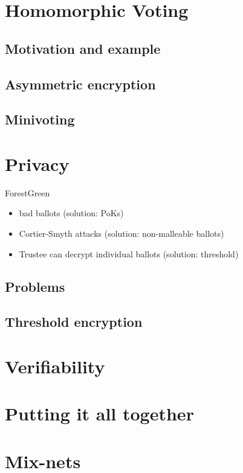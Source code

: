 \documentclass{llncs}
\newenvironment{structure}{
  \begin{color}{ForestGreen}
}{
  \end{color}
}
\begin{document}
\section{Homomorphic Voting}

\subsection{Motivation and example}

\subsection{Asymmetric encryption}

\subsection{Minivoting}

\section{Privacy}

\begin{structure}
\begin{itemize}
\item bad ballots (solution: PoKs)
\item Cortier-Smyth attacks (solution: non-malleable ballots)
\item Trustee can decrypt individual ballots (solution: threshold)
\end{itemize}
\end{structure}

\subsection{Problems}

\subsection{Threshold encryption}

\section{Verifiability}

\section{Putting it all together}

\section{Mix-nets}
\end{document}
